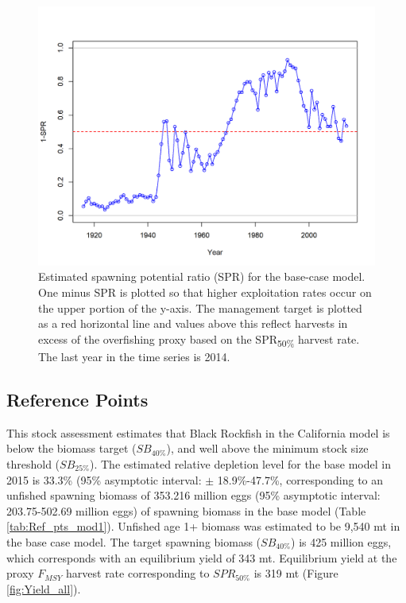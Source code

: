 \documentclass[12pt,]{article}
\begin{document}
\begin{figure}[htbp]
\centering
\includegraphics{r4ss/plots_mod1/SPR2_minusSPRseries.png}
\caption{Estimated spawning potential ratio (SPR) for the base-case
model. One minus SPR is plotted so that higher exploitation rates occur
on the upper portion of the y-axis. The management target is plotted as
a red horizontal line and values above this reflect harvests in excess
of the overfishing proxy based on the SPR\textsubscript{50\%} harvest
rate. The last year in the time series is 2014. \label{fig:SPR_all}}
\end{figure}

\FloatBarrier

\subsection*{Reference Points}\label{reference-points}

This stock assessment estimates that Black Rockfish in the California
model is below the biomass target (\(SB_{40\%}\)), and well above the
minimum stock size threshold (\(SB_{25\%}\)). The estimated relative
depletion level for the base model in 2015 is 33.3\% (95\% asymptotic
interval: \(\pm\) 18.9\%-47.7\%, corresponding to an unfished spawning
biomass of 353.216 million eggs (95\% asymptotic interval: 203.75-502.69
million eggs) of spawning biomass in the base model (Table
\ref{tab:Ref_pts_mod1}). Unfished age 1+ biomass was estimated to be
9,540 mt in the base case model. The target spawning biomass
(\(SB_{40\%}\)) is 425 million eggs, which corresponds with an
equilibrium yield of 343 mt. Equilibrium yield at the proxy \(F_{MSY}\)
harvest rate corresponding to \(SPR_{50\%}\) is 319 mt (Figure
\ref{fig:Yield_all}).
\end{document}
